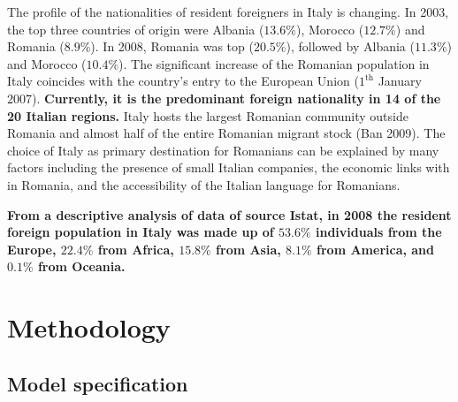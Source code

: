 \documentclass[10pt] {article}
\theoremstyle{definition}
\theoremstyle{plain}
\begin{document}
The profile of the nationalities of resident foreigners in Italy is changing. In 2003, the top three countries of origin were Albania ($13.6\%$), Morocco ($12.7\%$) and Romania ($8.9\%$). In 2008, Romania was top ($20.5\%$), followed by Albania ($11.3\%$) and Morocco ($10.4\%$). The significant increase of the Romanian population in Italy coincides with the country's entry to the European Union ($1^\text{th}$ January 2007). \textbf{Currently, it is the predominant foreign nationality in 14 of the 20 Italian regions.} Italy hosts the largest Romanian community outside Romania and almost half of the entire Romanian migrant stock (Ban 2009). The choice of Italy as primary destination for Romanians can be explained by many factors including the presence of small Italian companies, the economic links with in Romania, and the accessibility of the Italian language for Romanians. 

\textbf{From a descriptive analysis of data of source Istat, in 2008 the resident foreign population in Italy was made up of $53.6\%$ individuals from the Europe, $22.4\%$ from Africa, $15.8\%$ from Asia, $8.1\%$ from America, and $0.1\%$ from Oceania.}


\section{Methodology \label{METH}}

\subsection{Model specification \label{MS}}
\end{document}
